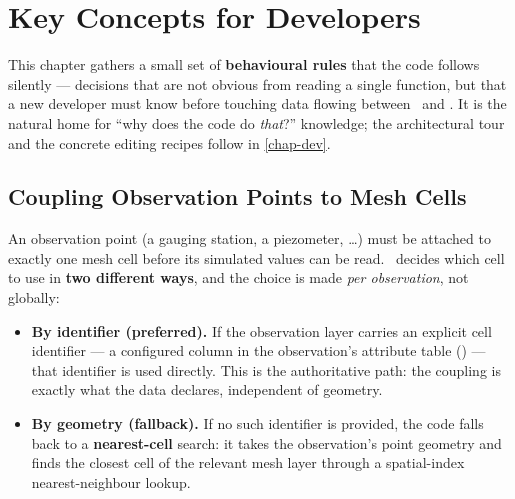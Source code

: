\chapter{Key Concepts for Developers}
\label{chap-key-concepts}

\renewcommand{\headrulewidth}{0.3pt}
\fancyhead[LE]{\thepage} \fancyhead[RE]{\nouppercase{\textbf{\leftmark}}}
\fancyhead[RO]{\thepage} \fancyhead[LO]{\nouppercase{\textbf{\rightmark}}}
\fancyfoot[L,C,R]{}

\setlength{\parindent}{0.35cm}

\minitoc
\newpage

This chapter gathers a small set of \textbf{behavioural rules} that the code
follows silently --- decisions that are not obvious from reading a single
function, but that a new developer must know before touching data flowing
between \cawaqs~and \cwv. It is the natural home for ``why does the code do
\emph{that}?'' knowledge; the architectural tour and the concrete editing
recipes follow in \cref{chap-dev}.

\section{Coupling Observation Points to Mesh Cells}
\label{sec-obs-coupling}

An observation point (a gauging station, a piezometer, \ldots) must be attached
to exactly one mesh cell before its simulated values can be read. \cwv~decides
which cell to use in \textbf{two different ways}, and the choice is made
\emph{per observation}, not globally:

\begin{itemize}
    \item \textbf{By identifier (preferred).} If the observation layer carries an
    explicit cell identifier --- a configured  column in the
    observation's attribute table () --- that identifier is used
    directly. This is the authoritative path: the coupling is exactly what the
    data declares, independent of geometry.

    \item \textbf{By geometry (fallback).} If no such identifier is provided, the
    code falls back to a \textbf{nearest-cell} search: it takes the observation's
    point geometry and finds the closest cell of the relevant mesh layer through
    a spatial-index nearest-neighbour lookup.
\end{itemize}

